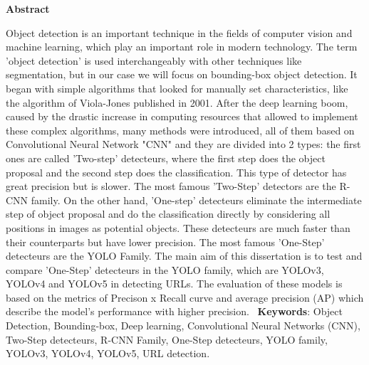 \newpage
\thispagestyle{empty}
\begin{center}
{\Large \textbf{Abstract}}
\end{center}
Object detection is an important technique in the fields of computer vision and machine learning, which play an important role in modern technology.
The term 'object detection' is used interchangeably with other techniques like segmentation, but in our case we will focus on bounding-box object detection.
It began with simple algorithms that looked for manually set characteristics, like the algorithm of Viola-Jones published in 2001. After the deep learning boom, caused by the drastic increase in computing resources that allowed to implement these complex algorithms, many methods were introduced, all of them based on Convolutional Neural Network "CNN" and they are divided into 2 types:
the first ones are called 'Two-step' detecteurs, where the first step does the object proposal and the second step does the classification. This type of detector has great precision but is slower. The most famous 'Two-Step' detectors are the R-CNN family. 
On the other hand, 'One-step' detecteurs eliminate the intermediate step of object proposal and do the classification directly by considering all positions in images as potential objects. These detecteurs are much faster than their counterparts but have lower precision. The most famous 'One-Step' detecteurs are the YOLO Family. 
The main aim of this dissertation is to test and compare 'One-Step' detecteurs in the YOLO family, which are YOLOv3, YOLOv4 and YOLOv5 in detecting URLs. 
The evaluation of these models is based on the metrics of Precison x Recall curve and average precision (AP) which describe the model's performance with higher precision. 
\vspace{1cm}
\textbf{Keywords}: Object Detection, Bounding-box, Deep learning, Convolutional Neural Networks (CNN), Two-Step detecteurs, R-CNN Family, One-Step detecteurs, YOLO family, YOLOv3, YOLOv4, YOLOv5, URL detection.


